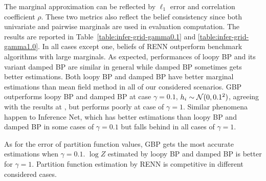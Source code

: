 \begin{sidewaystable}[ph!]
\begin{center}
\begin{small}
\begin{tabular}{lcccccccc}



        

        \bottomrule
      \end{tabular}
    \end{small}
  \end{center}
\end{sidewaystable}

The marginal approximation can be reflected by $\ell_1$ error and correlation coefficient $\rho$. These two metrics also reflect the belief consistency since both univariate and pairwise marginals are used in evaluation computation. The results are reported in Table~\ref{table:infer-grid-gamma0.1} and \ref{table:infer-grid-gamma1.0}. In all cases except one, beliefs of RENN outperform benchmark algorithms with large marginals. As expected, performances of loopy BP and its variant damped BP are similar in general while damped BP sometimes gets better estimations. Both loopy BP and damped BP have better marginal estimations than mean field method in all of our considered scenarios. GBP outperforms loopy BP and damped BP at case $\gamma=0.1$, $h_i\sim \mathcal{N}(0,0.1^2)$, agreeing with the results at \cite{yedida2005constucting}, but performs poorly at case of $\gamma=1$. Similar phenomena happen to Inference Net, which has better estimations than loopy BP and damped BP in some cases of $\gamma=0.1$ but falls behind in all cases of $\gamma=1$.


As for the error of partition function values, GBP gets the most accurate estimations when $\gamma=0.1$. $\log{Z}$ estimated by loopy BP and damped BP is better for $\gamma=1$. Partition function estimation by RENN is competitive in different considered cases.

